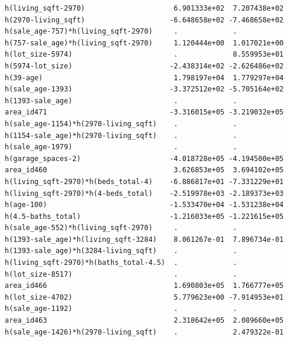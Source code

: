 \documentclass[
]{article}
\begin{document}
\begin{verbatim}
h(living_sqft-2970)                     6.901333e+02  7.207438e+02
h(2970-living_sqft)                    -6.648658e+02 -7.468658e+02
h(sale_age-757)*h(living_sqft-2970)     .             .           
h(757-sale_age)*h(living_sqft-2970)     1.120444e+00  1.017021e+00
h(lot_size-5974)                        .             8.559953e+01
h(5974-lot_size)                       -2.438314e+02 -2.626486e+02
h(39-age)                               1.798197e+04  1.779297e+04
h(sale_age-1393)                       -3.372512e+02 -5.705164e+02
h(1393-sale_age)                        .             .           
area_id471                             -3.316015e+05 -3.219032e+05
h(sale_age-1154)*h(2970-living_sqft)    .             .           
h(1154-sale_age)*h(2970-living_sqft)    .             .           
h(sale_age-1979)                        .             .           
h(garage_spaces-2)                     -4.018728e+05 -4.194500e+05
area_id460                              3.626853e+05  3.694102e+05
h(living_sqft-2970)*h(beds_total-4)    -6.886817e+01 -7.331229e+01
h(living_sqft-2970)*h(4-beds_total)    -2.519978e+03 -2.189373e+03
h(age-100)                             -1.533470e+04 -1.531238e+04
h(4.5-baths_total)                     -1.216033e+05 -1.221615e+05
h(sale_age-552)*h(living_sqft-2970)     .             .           
h(1393-sale_age)*h(living_sqft-3284)    8.061267e-01  7.896734e-01
h(1393-sale_age)*h(3284-living_sqft)    .             .           
h(living_sqft-2970)*h(baths_total-4.5)  .             .           
h(lot_size-8517)                        .             .           
area_id466                              1.690803e+05  1.766777e+05
h(lot_size-4702)                        5.779623e+00 -7.914953e+01
h(sale_age-1192)                        .             .           
area_id463                              2.318642e+05  2.089660e+05
h(sale_age-1426)*h(2970-living_sqft)    .             2.479322e-01
                                                                  

\end{verbatim}
\end{document}
